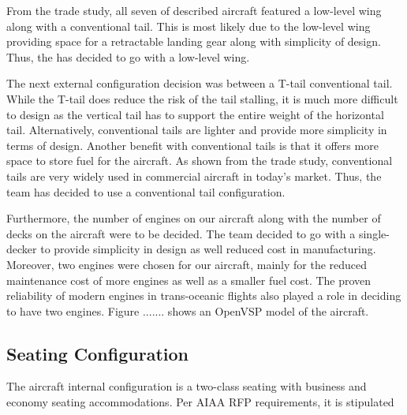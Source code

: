 From the trade study, all seven of described aircraft featured a low-level wing along with a conventional tail. This is most likely due to the low-level wing providing space for a retractable landing gear along with simplicity of design. Thus, the has decided to go with a low-level wing.

The next external configuration decision was between a T-tail conventional tail. While the T-tail does reduce the risk of the tail stalling, it is much more difficult to design as the vertical tail has to support the entire weight of the horizontal tail. Alternatively, conventional tails are lighter and provide more simplicity in terms of design. Another benefit with conventional tails is that it offers more space to store fuel for the aircraft. As shown from the trade study, conventional tails are very widely used in commercial aircraft in today's market. Thus, the team has decided to use a conventional tail configuration. 

Furthermore, the number of engines on our aircraft along with the number of decks on the aircraft were to be decided. The team decided to go with a single-decker to provide simplicity in design as well reduced cost in manufacturing. Moreover, two engines were chosen for our aircraft, mainly for the reduced maintenance cost of more engines as well as a smaller fuel cost. The proven reliability of modern engines in trans-oceanic flights also played a role in deciding to have two engines. Figure ....... shows an OpenVSP model of the aircraft. 


\subsection{Seating Configuration}
The aircraft internal configuration is a two-class seating with business and economy seating accommodations.  Per AIAA RFP requirements, it is stipulated